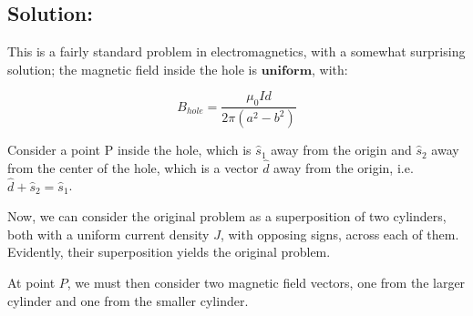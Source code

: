 \documentclass{article}
\begin{document}
\subsection{Solution:} This is a fairly standard problem in electromagnetics, with a somewhat surprising solution; the magnetic field inside the hole is $\textbf{uniform}$, with:

\[
B_{hole} = \frac{\mu_0 I d}{2\pi (a^2-b^2)}
\]

Consider a point P inside the hole, which is $\hat{s}_1$ away from the origin and $\hat{s}_2$ away from the center of the hole, which is a vector $\hat{d}$ away from the origin, i.e. $\hat{d} + \hat{s}_2 = \hat{s}_1$. 

\begin{figure}[ht!]
\centering
{}
\end{figure}

Now, we can consider the original problem as a superposition of two cylinders, both with a uniform current density $J$, with opposing signs, across each of them. Evidently, their superposition yields the original problem. 
\vspace{3mm}

At point $P$, we must then consider two magnetic field vectors, one from the larger cylinder and one from the smaller cylinder. 
\end{document}
